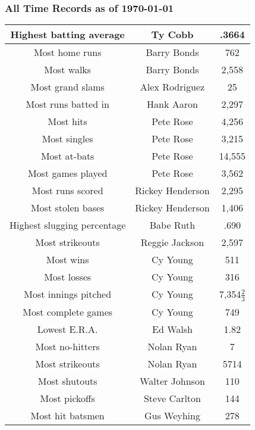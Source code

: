 			\subsubsection{All Time Records as of \today}
			\begin{center}


				\begin{tabular}{|c|c|c|}
				\hline
					Highest batting average & Ty Cobb & .3664 \\
					\hline
					Most home runs & Barry Bonds & 762 \\
					\hline
					Most walks & Barry Bonds & 2,558 \\
					\hline
					Most grand slams & Alex Rodriguez &	25 \\
					\hline
					Most runs batted in & Hank Aaron  & 2,297 \\
					\hline
					Most hits & Pete Rose & 4,256 \\
					\hline
					Most singles & Pete Rose & 3,215 \\
					\hline
					Most at-bats & Pete Rose & 14,555 \\
					\hline
					Most games played & Pete Rose & 3,562 \\
					\hline 
					Most runs scored & Rickey Henderson & 2,295 \\
					\hline
					Most stolen bases & Rickey Henderson & 1,406 \\
					\hline
					Highest slugging percentage & Babe Ruth & .690 \\
					\hline
					Most strikeouts & Reggie Jackson & 2,597 \\
					\hline
					Most wins 	&	Cy Young 	&	511	\\
					\hline
					Most losses 	&	Cy Young 	&	316	\\
					\hline
					Most innings pitched 	&	Cy Young 	&	7,354$\frac{2}{3}$ 	\\
					\hline	
					Most complete games 	&	Cy Young 	&	749	\\				
					\hline
					Lowest E.R.A. 	&	Ed Walsh 	&	1.82	\\
					\hline
					Most no-hitters 	&	Nolan Ryan 	&	7	\\
					\hline
					Most strikeouts 	&	Nolan Ryan 	&	5714	\\
					\hline
					Most shutouts 	&	Walter Johnson 	&	110	\\
					\hline
					Most pickoffs 	&	Steve Carlton 	&	144	\\
					\hline
					Most hit batsmen 	&	Gus Weyhing 	&	278	\\

\end{tabular}
\end{center}
